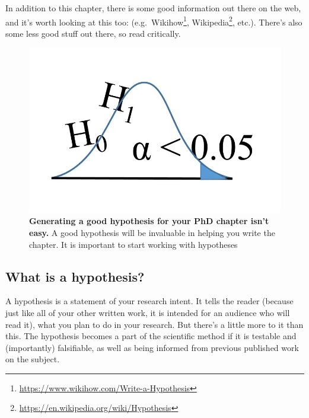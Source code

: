 \documentclass[
]{krantz}
\renewcommand{\href}[2]{#2\footnote{\url{#1}}}
\begin{document}
In addition to this chapter, there is some good information out there on the web, and it's worth looking at this too: (e.g.~\href{https://www.wikihow.com/Write-a-Hypothesis}{Wikihow}, \href{https://en.wikipedia.org/wiki/Hypothesis}{Wikipedia}, etc.). There's also some less good stuff out there, so read critically.



\begin{figure}

{\centering \includegraphics[width=0.9\linewidth]{figures/hypothesis} 

}

\caption{\textbf{Generating a good hypothesis for your PhD chapter isn't easy.} A good hypothesis will be invaluable in helping you write the chapter. It is important to start working with hypotheses}\label{fig:Hypothesis}
\end{figure}

\hypertarget{whathypothesis}{%
\subsection{What is a hypothesis?}\label{whathypothesis}}

A hypothesis is a statement of your research intent. It tells the reader (because just like all of your other written work, it is intended for an audience who will read it), what you plan to do in your research. But there's a little more to it than this. The hypothesis becomes a part of the scientific method if it is testable and (importantly) falsifiable, as well as being informed from previous published work on the subject.
\end{document}
